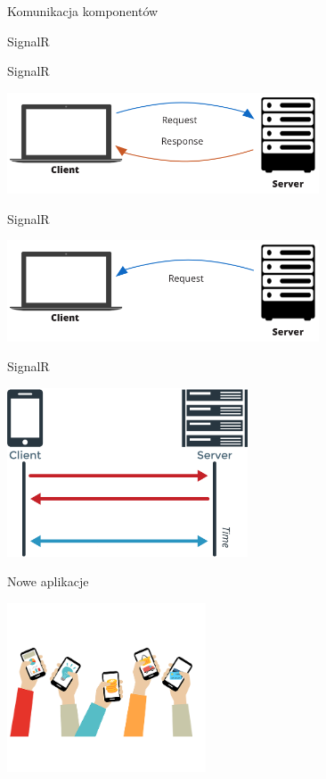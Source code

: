 \documentclass{beamer}
\begin{document}
\begin{frame}{Komunikacja komponentów}
	\begin{center}
		\Huge{SignalR}
	\end{center}
\end{frame}

\begin{frame}{SignalR}
	\begin{center}
		\includegraphics[height=3cm]{prosta_komunikacja2.png}
	\end{center}
\end{frame}

\begin{frame}{SignalR}
	\begin{center}
		\includegraphics[height=3cm]{signalr1.png}
	\end{center}
\end{frame}

\begin{frame}{SignalR}
	\begin{center}
		\includegraphics[height=5cm]{websocket1.png}
	\end{center}
\end{frame}

\begin{frame}{Nowe aplikacje}
	\begin{center}
		\includegraphics[height=5cm]{phone2.png}
	\end{center}
\end{frame}
\end{document}
